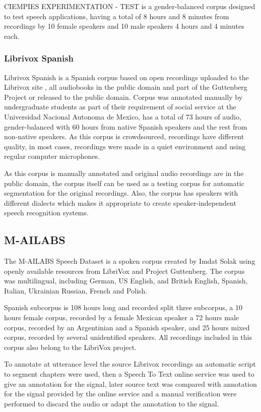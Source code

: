 \documentclass[10pt, a4paper]{article}
\begin{document}
CIEMPIES EXPERIMENTATION - TEST is a gender-balanced corpus designed to test speech applications, having a total of 8 hours and 8 minutes from recordings by 10 female speakers and 10 male speakers 4 hours and 4 minutes each.

\subsubsection{Librivox Spanish}

Librivox Spanish is a Spanish corpus based on open recordings uploaded to the Librivox site \cite{LibriVox}, all audiobooks in the public domain and part of the Guttenberg Project \cite{gutenberg} or released to the public domain. Corpus was annotated manually by undergraduate students as part of their requirement of social service at the Universidad Nacional Autonoma de Mexico, has a total of 73 hours of audio, gender-balanced with 60 hours from native Spanish speakers and the rest from non-native speakers. As this corpus is crowdsourced, recordings have different quality, in most cases, recordings were made in a quiet environment and using regular computer microphones.

As this corpus is manually annotated and original audio recordings are in the public domain, the corpus itself can be used as a testing corpus for automatic segmentation for the original recordings. Also, the corpus has speakers with different dialects which makes it appropriate to create speaker-independent speech recognition systems.


\subsection{M-AILABS}

The M-AILABS Speech Dataset is a spoken corpus created by Imdat Solak using openly available resources from LibriVox and Project Guttenberg. The corpus was multilingual, including German, US English, and British English, Spanish, Italian, Ukrainian Russian, French and Polish.

Spanish subcorpus is 108 hours long and recorded split three subcorpus, a 10 hours female corpus, recorded by a female Mexican speaker a 72 hours male corpus, recorded by an Argentinian and a Spanish speaker, and  25 hours mixed corpus, recorded by several unidentified speakers. All recordings included in this corpus also belong to the LibriVox project.

To annotate at utterance level the source Librivox recordings an automatic script to segment chapters were used, then a Speech To Text online service was used to give an annotation for the signal, later source text was compared with annotation for the signal provided by the online service and a manual verification were performed to discard the audio or adapt the annotation to the signal.
\end{document}
